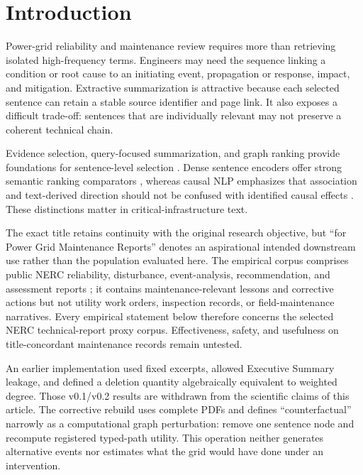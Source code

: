 \documentclass[applsci,article,submit,moreauthors]{Definitions/mdpi}
\begin{document}
\section{Introduction}

Power-grid reliability and maintenance review requires more than retrieving isolated high-frequency terms. Engineers may need the sequence linking a condition or root cause to an initiating event, propagation or response, impact, and mitigation. Extractive summarization is attractive because each selected sentence can retain a stable source identifier and page link. It also exposes a difficult trade-off: sentences that are individually relevant may not preserve a coherent technical chain.

Evidence selection, query-focused summarization, and graph ranking provide foundations for sentence-level selection \cite{thorne2018fever,zhong2021qmsum,vig2022exploring,wang2020heterogeneous}. Dense sentence encoders offer strong semantic ranking comparators \cite{reimers2019sentencebert}, whereas causal NLP emphasizes that association and text-derived direction should not be confused with identified causal effects \cite{feder2022causal,du2022ecare}. These distinctions matter in critical-infrastructure text.

The exact title retains continuity with the original research objective, but ``for Power Grid Maintenance Reports'' denotes an aspirational intended downstream use rather than the population evaluated here. The empirical corpus comprises public NERC reliability, disturbance, event-analysis, recommendation, and assessment reports \cite{nercEventAnalysis,nerc2015qualityreport}; it contains maintenance-relevant lessons and corrective actions but not utility work orders, inspection records, or field-maintenance narratives. Every empirical statement below therefore concerns the selected NERC technical-report proxy corpus. Effectiveness, safety, and usefulness on title-concordant maintenance records remain untested.

An earlier implementation used fixed excerpts, allowed Executive Summary leakage, and defined a deletion quantity algebraically equivalent to weighted degree. Those v0.1/v0.2 results are withdrawn from the scientific claims of this article. The corrective rebuild uses complete PDFs and defines ``counterfactual'' narrowly as a computational graph perturbation: remove one sentence node and recompute registered typed-path utility. This operation neither generates alternative events nor estimates what the grid would have done under an intervention.
\end{document}

